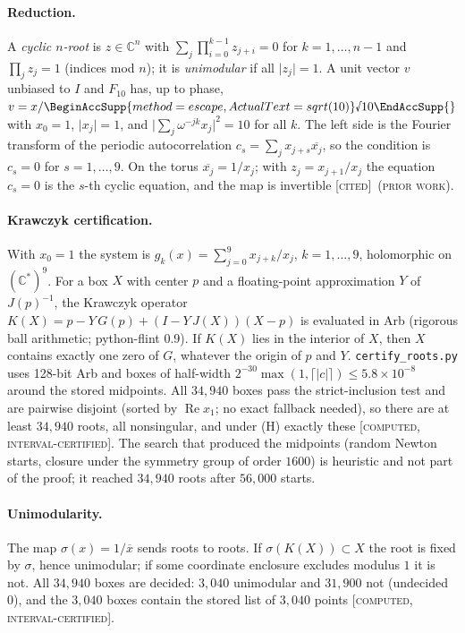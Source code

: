 \documentclass[11pt]{article}
\newcommand{\rnum}[1]{\BeginAccSupp{method=escape,ActualText=sqrt(#1)}\text{\textsurd}#1\EndAccSupp{}}
\newcommand{\C}{\mathbb{C}}
\newcommand{\abs}[1]{\lvert #1\rvert}
\newcommand{\st}[1]{\textsc{[#1]}}
\newcommand{\stcert}{\st{computed, interval-certified}}
\newcommand{\stcited}{\st{cited}}
\newcommand{\prior}{\textsc{(prior work)}}
\theoremstyle{definition}
\theoremstyle{remark}
\begin{document}
\paragraph{Reduction.} A \emph{cyclic $n$-root} is $z\in\C^n$ with $\sum_{j}\prod_{i=0}^{k-1}z_{j+i}=0$ for
$k=1,\dots,n-1$ and $\prod_jz_j=1$ (indices mod $n$); it is \emph{unimodular} if all $\abs{z_j}=1$. A unit vector
$v$ unbiased to $I$ and $F_{10}$ has, up to phase, $v=x/\rnum{10}$ with $x_0=1$, $\abs{x_j}=1$, and
$\abs{\sum_j\omega^{-jk}x_j}^2=10$ for all $k$. The left side is the Fourier transform of the periodic autocorrelation
$c_s=\sum_jx_{j+s}\overline{x_j}$, so the condition is $c_s=0$ for $s=1,\dots,9$. On the torus $\overline{x_j}=1/x_j$;
with $z_j=x_{j+1}/x_j$ the equation $c_s=0$ is the $s$-th cyclic equation, and the map is invertible
\cite{FR15} \stcited\ \prior.

\paragraph{Krawczyk certification.} With $x_0=1$ the system is $g_k(x)=\sum_{j=0}^{9}x_{j+k}/x_j$, $k=1,\dots,9$,
holomorphic on $(\C^*)^9$. For a box $X$ with center $p$ and a floating-point approximation $Y$ of $J(p)^{-1}$, the
Krawczyk operator $K(X)=p-Y\,G(p)+(I-Y\,J(X))(X-p)$ is evaluated in Arb (rigorous ball arithmetic; python-flint 0.9).
If $K(X)$ lies in the interior of $X$, then $X$ contains exactly one zero of $G$, whatever the origin of $p$ and $Y$.
\texttt{certify\_roots.py} uses 128-bit Arb and boxes of half-width $2^{-30}\max(1,\lceil\abs c\rceil)\le5.8\times10^{-8}$
around the stored midpoints. All $34{,}940$ boxes pass the strict-inclusion test and are pairwise disjoint (sorted by
$\operatorname{Re}x_1$; no exact fallback needed), so there are at least $34{,}940$ roots, all nonsingular, and under
(H) exactly these \stcert. The search that produced the midpoints (random Newton starts, closure under the symmetry
group of order $1600$) is heuristic and not part of the proof; it reached $34{,}940$ roots after $56{,}000$ starts.

\paragraph{Unimodularity.} The map $\sigma(x)=1/\overline{x}$ sends roots to roots. If $\sigma(K(X))\subset X$ the
root is fixed by $\sigma$, hence unimodular; if some coordinate enclosure excludes modulus $1$ it is not. All
$34{,}940$ boxes are decided: $3{,}040$ unimodular and $31{,}900$ not (undecided $0$), and the $3{,}040$ boxes contain
the stored list of $3{,}040$ points \stcert.
\end{document}
